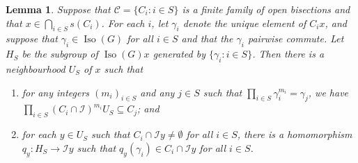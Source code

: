 \documentclass[a4paper, 12pt]{amsart}
\theoremstyle{plain}
\newtheorem{lemma}[theorem]{Lemma}
\theoremstyle{definition}
\theoremstyle{remark}
\newcommand{\Iso}{\operatorname{Iso}}
\newcommand{\Ii}{\mathcal{I}}
\numberwithin{equation}{section}
\begin{document}
\begin{lemma}\label{lem:subgroup}
Suppose
that $\mathcal{C} = \{C_i : i \in S\}$ is a finite family of open bisections
and that $x \in \bigcap_{i \in S} s(C_i)$. For each $i$, let $\gamma_i$
denote the unique element of $C_i x$, and suppose that $\gamma_i \in \Iso(G)$
for all $i \in S$ and that the $\gamma_i$ pairwise commute. Let $H_S$ be the
subgroup of $\Iso(G)x$ generated by $\{\gamma_i : i \in S\}$. Then there is a
neighbourhood $U_S$ of $x$ such that
\begin{enumerate}[label=\textup{(\arabic*)}]
\item\label{it:lem subgroup:integers} for any integers $(m_i)_{i \in S}$ and any $j \in S$ such that
    $\prod_{i \in S} \gamma_i^{m_i} = \gamma_j$, we have $\prod_{i \in S}
    (C_i \cap \Ii)^{m_i} U_S \subseteq C_j$; and
\item\label{it:lem subgroup:hom} for each $y \in U_S$ such that $C_i \cap \Ii y \not= \emptyset$ for
    all $i \in S$, there is a homomorphism $q_y \colon H_S \to \Ii y$ such that
    $q_y(\gamma_i) \in C_i \cap \Ii y$ for all $i \in S$.
\end{enumerate}
\end{lemma}
\end{document}
